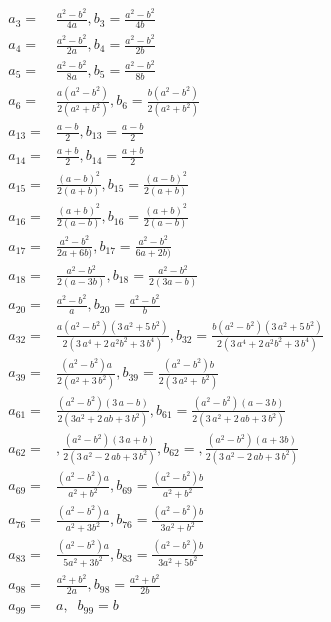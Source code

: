 \begin{align*}
	a_3=& \frac{a^2-b^2}{4a}, b_3=\frac{a^2-b^2}{4b}\\
	a_4=&\frac{a^2-b^2}{2a}, b_4=\frac{a^2-b^2}{2b}\\
	a_5=& \frac{a^2-b^2}{8a}, b_5=\frac{a^2-b^2}{8b} \\
	a_6=&\frac{a(a^2-b^2)}{2(a^2+b^2)}  ,b_6=\frac{b(a^2-b^2)}{2(a^2+b^2)} \\
	a_{13}=& \frac{a-b}{2}, b_{13}= \frac{a-b}{2}\\
	a_{14}=& \frac{a+b}{2}, b_{14}= \frac{a+b}{2}\\
	a_{15}=& \frac{(a-b)^2}{2(a+b)} , b_{15}= \frac{(a-b)^2}{2(a+b)}\\
	a_{16}=&\frac{(a+b)^2}{2(a-b)},     b_{16}=\frac{(a+b)^2}{2(a-b)}\\
	a_{17}=&\frac{a^2-b^2}{2a+6b)},     b_{17}= \frac{a^2-b^2}{6a+2b)}\\
	a_{18}=&\frac{a^2-b^2}{2(a-3b)},     b_{18}= \frac{a^2-b^2}{2(3a-b)}\\
	a_{20}=&\frac{a^2-b^2}{a},     b_{20}=\frac{a^2-b^2}{b}\\
	a_{32}=& \frac {a \left( a^2-b^2 \right)   \left( 3\,{a}^
			{2}+5\,{b}^{2} \right) }{2(3\,{a}^{4}+2\,{a}^{2}{b}^{2}+3\,{b}^{4})},  b_{32}= \frac {b \left( a^2-b^2 \right)   \left( 3\,{a}^
			{2}+5\,{b}^{2} \right) }{2(3\,{a}^{4}+2\,{a}^{2}{b}^{2}+3\,{b}^{4})}\\
	a_{39}=&\frac { \left( {a}^{2}-{b}^{2} \right) a}{2( {a}^{2}+3\,{b}^{2})},
	b_{39}=\frac{ \left( {a}^{2}-{b}^{2} \right) b}{2(3 \,{a}^{2}+\,{b}^{2})}\\
	a_{61}=& \frac {    \left( a^2-b^2\right)  \left( 3\,a-b
			\right) }{2( 3a^{2}+2\,ab+3\,{b}^{2})},
		b_{61}= \frac { \left( a^2-b^2 \right)  \left( a-3\,b \right)    }{2(3\,{a}^{2}+2\,ab+3\,{b}^{2})}\\
		a_{62}=& ,{\frac {  \left( a^2-b^2 \right)  \left( 3\,a+b
				\right) }{2(3\,{a}^{2}-2\,ab+3\,{b}^{2})}},
			b_{62}= ,{\frac {  \left( a^2-b^2 \right)  \left( a+3b
					\right) }{2(3\,{a}^{2}-2\,ab+3\,{b}^{2})}}\\
				a_{69}=&{\frac { \left( a^2-b^2 \right)    a}{{a}^{2}+{b}^{2}}},
				b_{69}=\frac { \left( a^2-b^2 \right)    b}{{a}^{2}+{b}^{2}}\\
		a_{76}=&  \frac { \left( a^2-b^2 \right)    a}{{a}^{2}+3{b}^{2}},  b_{76}= \frac{ \left( a^2-b^2 \right)    b}{3{a}^{2}+{b}^{2}}\\
		a_{83}=&  \frac { \left( a^2-b^2 \right)    a}{5{a}^{2}+3{b}^{2}},b_{83}= \frac{ \left( a^2-b^2 \right)    b}{3{a}^{2}+5{b}^{2}}\\
		a_{98}=& \frac{a^2+b^2}{2a}, 	b_{98}= \frac{a^2+b^2}{2b}\\
		a_{99}=&a,\;\;
		b_{99}=b
\end{align*}

